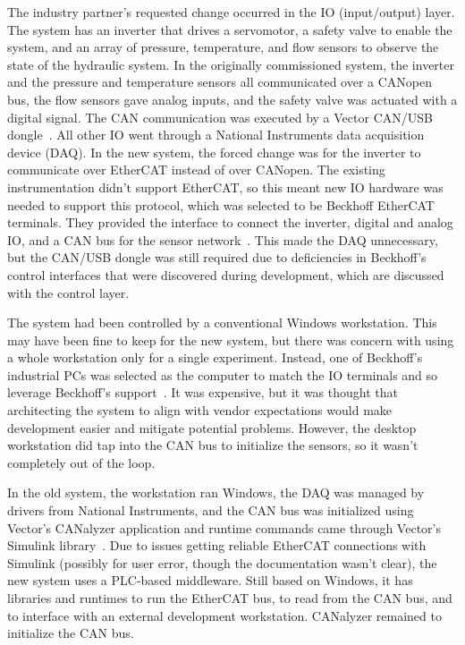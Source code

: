 \documentclass[english,12pt,a4paper,pdftex,eng,utf8]{aaltothesis}
\begin{document}
The industry partner's requested change occurred in the IO (input/output) layer. The system has an inverter that drives a servomotor, a safety valve to enable the system, and an array of pressure, temperature, and flow sensors to observe the state of the hydraulic system. In the originally commissioned system, the inverter and the pressure and temperature sensors all communicated over a CANopen bus, the flow sensors gave analog inputs, and the safety valve was actuated with a digital signal. The CAN communication was executed by a Vector CAN/USB dongle~\cite{VectorCanUsbDongle}. All other IO went through a National Instruments data acquisition device (DAQ). In the new system, the forced change was for the inverter to communicate over EtherCAT instead of over CANopen.  The existing instrumentation didn't support EtherCAT, so this meant new IO hardware was needed to support this protocol, which was selected to be Beckhoff EtherCAT terminals. They provided the interface to connect the inverter, digital and analog IO, and a CAN bus for the sensor network~\cite{BeckhoffEL6751}. This made the DAQ unnecessary, but the CAN/USB dongle was still required due to deficiencies in Beckhoff's control interfaces that were discovered during development, which are discussed with the control layer.

The system had been controlled by a conventional Windows workstation. This may have been fine to keep for the new system, but there was concern with using a whole workstation only for a single experiment. Instead, one of Beckhoff's industrial PCs was selected as the computer to match the IO terminals and so leverage Beckhoff's support~\cite{BeckhoffC60XX}. It was expensive, but it was thought that architecting the system to align with vendor expectations would make development easier and mitigate potential problems. However, the desktop workstation did tap into the CAN bus to initialize the sensors, so it wasn't completely out of the loop.

In the old system, the workstation ran Windows, the DAQ was managed by drivers from National Instruments, and the CAN bus was initialized using Vector's CANalyzer application and runtime commands came through Vector's Simulink library~\cite{VectorCanalyzer, SimulinkVectorCAN}. Due to issues getting reliable EtherCAT connections with Simulink (possibly for user error, though the documentation wasn't clear), the new system uses a PLC-based middleware. Still based on Windows, it has libraries and runtimes to run the EtherCAT bus, to read from the CAN bus, and to interface with an external development workstation. CANalyzer remained to initialize the CAN bus.
\end{document}
